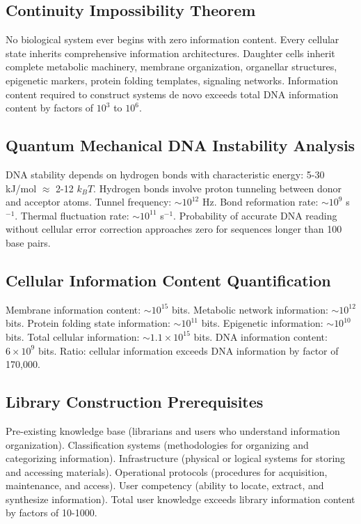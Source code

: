 \documentclass[12pt,a4paper]{article}
\begin{document}
\subsection{Continuity Impossibility Theorem}

No biological system ever begins with zero information content. Every cellular state inherits comprehensive information architectures. Daughter cells inherit complete metabolic machinery, membrane organization, organellar structures, epigenetic markers, protein folding templates, signaling networks. Information content required to construct systems de novo exceeds total DNA information content by factors of $10^3$ to $10^6$.

\subsection{Quantum Mechanical DNA Instability Analysis}

DNA stability depends on hydrogen bonds with characteristic energy: 5-30 kJ/mol $\approx$ 2-12 $k_BT$. Hydrogen bonds involve proton tunneling between donor and acceptor atoms. Tunnel frequency: $\sim 10^{12}$ Hz. Bond reformation rate: $\sim 10^9$ s$^{-1}$. Thermal fluctuation rate: $\sim 10^{11}$ s$^{-1}$. Probability of accurate DNA reading without cellular error correction approaches zero for sequences longer than 100 base pairs.

\subsection{Cellular Information Content Quantification}

Membrane information content: $\sim 10^{15}$ bits. Metabolic network information: $\sim 10^{12}$ bits. Protein folding state information: $\sim 10^{11}$ bits. Epigenetic information: $\sim 10^{10}$ bits. Total cellular information: $\sim 1.1 \times 10^{15}$ bits. DNA information content: $6 \times 10^9$ bits. Ratio: cellular information exceeds DNA information by factor of 170,000.

\subsection{Library Construction Prerequisites}

Pre-existing knowledge base (librarians and users who understand information organization). Classification systems (methodologies for organizing and categorizing information). Infrastructure (physical or logical systems for storing and accessing materials). Operational protocols (procedures for acquisition, maintenance, and access). User competency (ability to locate, extract, and synthesize information). Total user knowledge exceeds library information content by factors of 10-1000.
\end{document}
